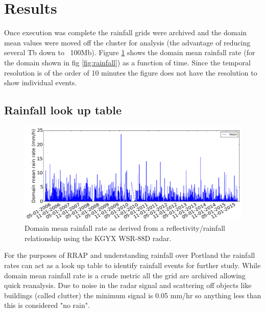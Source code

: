 \documentclass[twocol]{ametsoc}
\begin{document}
\section{Results}
Once execution was complete the rainfall grids were archived and the domain mean values were moved off the cluster for analysis (the 
advantage of reducing several Tb down to ~100Mb). Figure \ref{fig:clim} shows the domain mean rainfall rate (for the domain shown 
in fig \ref{fig:rainfall}) as a function of time. Since the temporal resolution is of the order of 10 minutes the figure does not have the resolution
to show individual events. 
\subsection{Rainfall look up table}
\begin{figure}[h]
    \centering
    \includegraphics[width=0.9\columnwidth]{climatology.png}
    \caption{Domain mean rainfall rate as derived from a reflectivity/rainfall relationship using the KGYX WSR-88D radar. }
    \label{fig:clim}
\end{figure}
For the purposes of RRAP and understanding rainfall over Portland the rainfall rates can act as a look up table to identify
rainfall events for further study. While domain mean rainfall rate is a crude metric all the grid are archived allowing quick 
reanalysis. Due to noise in the radar signal and scattering off objects like buildings (called clutter) the minimum signal 
is 0.05 mm/hr so anything less than this is considered "no rain". 
\end{document}
